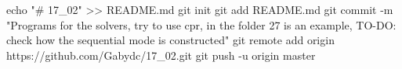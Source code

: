 echo "# 17_02" >> README.md
git init
git add README.md
git commit -m "Programs for the solvers, try to use cpr, in the folder 27 is an example, TO-DO: check how the sequential mode is constructed"
git remote add origin https://github.com/Gabydc/17_02.git
git push -u origin master
